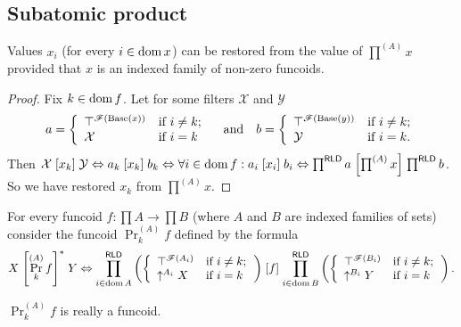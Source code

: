 \subsection{Subatomic product}
\begin{prop}
Values $x_{i}$ (for every $i\in\operatorname{dom} x$) can be restored from the
value of $\prod^{(A)}x$ provided that $x$ is an indexed family of
non-zero funcoids.\end{prop}
\begin{proof}
Fix $k\in\operatorname{dom} f$. Let for some filters $\mathcal{X}$ and $\mathcal{Y}$ 
\[
a=\left\{ \begin{array}{ll}
\top^{\mathscr{F}(\operatorname{Base}(x))} & \text{if }i\neq k;\\
\mathcal{X} & \text{if }i=k
\end{array}\right.\quad\text{and}\quad b=\left\{ \begin{array}{ll}
\top^{\mathscr{F}(\operatorname{Base}(y))} & \text{if }i\neq k;\\
\mathcal{Y} & \text{if }i=k.
\end{array}\right.
\]
Then $\mathcal{X}\mathrel{\left[x_{k}\right]}\mathcal{Y}\Leftrightarrow a_{k}\mathrel{\left[x_{k}\right]}b_{k}\Leftrightarrow\forall i\in\operatorname{dom} f:a_{i}\mathrel{\left[x_{i}\right]}b_{i}\Leftrightarrow\prod^{\mathsf{RLD}}a\mathrel{\left[\prod^{(A)}x\right]}\prod^{\mathsf{RLD}}b$.
So we have restored $x_{k}$ from $\prod^{(A)}x$.\end{proof}
\begin{defn}
For every funcoid $f:\prod A\rightarrow\prod B$ (where $A$ and $B$
are indexed families of sets) consider the funcoid $\Pr_{k}^{(A)}f$
defined by the formula 
\[
X\mathrel{\left[\Pr_{k}^{(A)}f\right]^{\ast}}Y\Leftrightarrow\prod_{i\in\operatorname{dom} A}^{\mathsf{RLD}}\left(\left\{ \begin{array}{ll}
\top^{\mathscr{F}(A_{i})} & \text{if }i\neq k;\\
\uparrow^{A_{i}}X & \text{if }i=k
\end{array}\right.\right)\mathrel{\left[f\right]}\prod_{i\in\operatorname{dom} B}^{\mathsf{RLD}}\left(\left\{ \begin{array}{ll}
\top^{\mathscr{F}(B_{i})} & \text{if }i\neq k;\\
\uparrow^{B_{i}}Y & \text{if }i=k
\end{array}\right.\right).
\]
\end{defn}
\begin{prop}
$\Pr_{k}^{(A)}f$ is really a funcoid.\end{prop}
